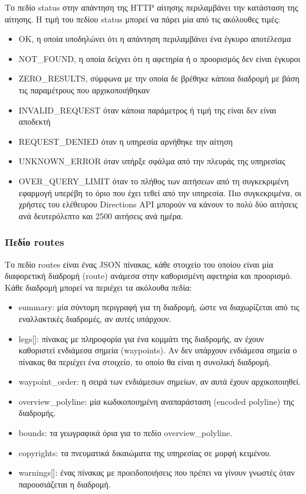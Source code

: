 Το πεδίο status στην απάντηση της HTTP αίτησης περιλαμβάνει την κατάσταση της αίτησης. Η τιμή του πεδίου status μπορεί να πάρει μία από τις ακόλουθες τιμές:
\begin{itemize}
 \item OK, η οποία υποδηλώνει ότι η απάντηση περιλαμβάνει ένα έγκυρο αποτέλεσμα 
 \item NOT\_FOUND, η οποία δείχνει ότι η αφετηρία ή ο προορισμός δεν είναι έγκυροι
 \item ZERO\_RESULTS, σύμφωνα με την οποία δε βρέθηκε κάποια διαδρομή με βάση τις παραμέτρους που αρχικοποιήθηκαν
 \item INVALID\_REQUEST όταν κάποια παράμετρος ή τιμή της είναι δεν είναι αποδεκτή
 \item REQUEST\_DENIED όταν η υπηρεσία αρνήθηκε την αίτηση 
 \item UNKNOWN\_ERROR όταν υπήρξε σφάλμα από την πλευράς της υπηρεσίας
 \item OVER\_QUERY\_LIMIT όταν το πλήθος των αιτήσεων από τη συγκεκριμένη εφαρμογή υπερέβη το όριο που έχει τεθεί από την υπηρεσία. Πιο 
συγκεκριμένα, οι χρήστες του ελέθευρου Directions API μπορούν να κάνουν το πολύ δύο αιτήσεις ανά δευτερόλεπτο και 2500 αιτήσεις ανά ημέρα.
\end{itemize}

\subsubsection{Πεδίο routes}

Το πεδίο routes είναι ένας JSON πίνακας, κάθε στοιχείο του οποίου είναι μία διαφορετική διαδρομή (route) ανάμεσα στην καθορισμένη αφετηρία και προορισμό. 
Κάθε διαδρομή μπορεί να περιέχει τα ακόλουθα πεδία:

\begin{itemize}
 \item summary: μία σύντομη περιγραφή για τη διαδρομή, ώστε να διαχωρίζεται από τις εναλλακτικές διαδρομές, αν αυτές υπάρχουν.
 \item legs[]: πίνακας με πληροφορία για ένα κομμάτι της διαδρομής, αν έχουν καθοριστεί ενδιάμεσα σημεία (waypoints). Αν δεν υπάρχουν ενδιάμεσα σημεία ο πίνακας 
 θα περιέχει ένα στοιχείο, το οποίο θα είναι η συνολική διαδρομή.
 \item waypoint\_order: η σειρά των ενδιάμεσων σημείων, αν αυτά έχουν αρχικοποιηθεί.
 \item overview\_polyline: μία κωδικοποιημένη αναπαράσταση (encoded polyline) της διαδρομής.
 \item bounds: τα γεωγραφικά όρια για το πεδίο overview\_polyline.
 \item copyrights: τα πνευματικά δικαιώματα της υπηρεσίας σε μορφή κειμένου.
 \item warnings[]: ένας πίνακας με προειδοποιήσεις που πρέπει να γίνουν γνωστές όταν παρουσιάζεται η διαδρομή.
\end{itemize}

